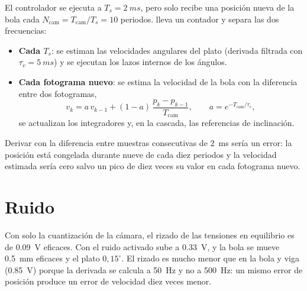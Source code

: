 El controlador se ejecuta a $T_s=\SI{2}{ms}$, pero solo recibe una posición nueva de la bola cada $N_{\text{cam}}=T_{\text{cam}}/T_s=10$ periodos.  lleva un contador y separa las dos frecuencias:
\begin{itemize}
  \item \textbf{Cada $T_s$}: se estiman las velocidades angulares del plato (derivada filtrada con $\tau_v=\SI{5}{ms}$) y se ejecutan los lazos internos de los ángulos.
  \item \textbf{Cada fotograma nuevo}: se estima la velocidad de la bola con la diferencia entre dos fotogramas,
  \begin{equation}
    v_k = a\,v_{k-1} + (1-a)\,\frac{p_k-p_{k-1}}{T_{\text{cam}}},\qquad a=e^{-T_{\text{cam}}/\tau_c},
  \end{equation}
  se actualizan los integradores y, en la cascada, las referencias de inclinación.
\end{itemize}
Derivar con la diferencia entre muestras consecutivas de \SI{2}{ms} sería un error: la posición está congelada durante nueve de cada diez periodos y la velocidad estimada sería cero salvo un pico de diez veces su valor en cada fotograma nuevo.

\section{Ruido}

Con solo la cuantización de la cámara, el rizado de las tensiones en equilibrio es de \SI{0.09}{V} eficaces. Con el ruido activado sube a \SI{0.33}{V}, y la bola se mueve \SI{0.5}{mm} eficaces y el plato $0{,}15^\circ$. El rizado es mucho menor que en la bola y viga (\SI{0.85}{V}) porque la derivada se calcula a \SI{50}{Hz} y no a \SI{500}{Hz}: un mismo error de posición produce un error de velocidad diez veces menor.

